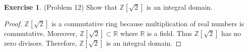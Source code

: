 \documentclass[12pt, psamsfonts]{amsart}
\theoremstyle{definition}
\newtheorem*{exer}{Exercise}
\theoremstyle{remark}
\numberwithin{equation}{section}
\begin{document}
\begin{exer}{(Problem 12)}
  Show that $\mathbb{Z}[\sqrt{2}]$ is an integral domain.
\end{exer}

\begin{proof}
  $\mathbb{Z}[\sqrt{2}]$ is a commutative ring because multiplication of real numbers is commutative.
  Moreover, $\mathbb{Z}[\sqrt{2}] \subset \mathbb{R}$ where $\mathbb{R}$ is a field.
  Thus $\mathbb{Z}[\sqrt{2}]$ has no zero divisors.
  Therefore, $\mathbb{Z}[\sqrt{2}]$ is an integral domain.
\end{proof}
\end{document}
